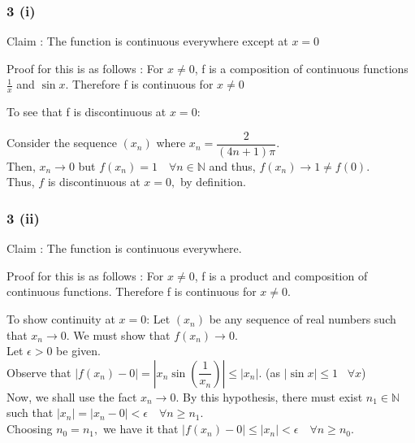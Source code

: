 \documentclass[handout]{beamer}
\begin{document}


\begin{frame}
\frametitle{3 (i)}
Claim : The function is continuous everywhere except at $x = 0$

Proof for this is as follows : 
For $x \ne  0$, f is a composition of continuous functions $\frac{1}{x}$ and $\sin{x}$. Therefore f is continuous 
for $x \ne  0$

To see that f is discontinuous at $x = 0 $:

Consider the sequence $(x_n)$ where $x_n = \dfrac{2}{(4n+1)\pi}.$\\
	Then, $x_n \to 0$ but $f(x_n) = 1 \quad \forall n \in \mathbb{N}$ and thus, $f(x_n) \to 1 \neq f(0).$\\
	Thus, $f$ is discontinuous at $x = 0,$ by definition.
\end{frame}

\begin{frame}
\frametitle{3 (ii)}
Claim : The function is continuous everywhere.

Proof for this is as follows : 
For $x \ne  0$, f is a product and composition of continuous functions. Therefore f is continuous for $x \ne 0$.

To show continuity at $x = 0$:
Let $(x_n)$ be any sequence of real numbers such that $x_n \to 0.$ We must show that $f(x_n) \to 0.$\\
Let $\epsilon > 0$ be given.\\
Observe that $|f(x_n) - 0| = \left|x_n\sin\left(\dfrac{1}{x_n}\right)\right| \le |x_n|.$ (as $|\sin{x}| \le 1 \; \; \; \forall x$)\\
Now, we shall use the fact $x_n \to 0.$ By this hypothesis, there must exist $n_1 \in \mathbb{N}$ such that $|x_n| = |x_n - 0| < \epsilon \quad \forall n \ge n_1.$\\
Choosing $n_0 = n_1,$ we have it that $|f(x_n) - 0| \le |x_n| < \epsilon \quad \forall n \ge n_0.$ 
\end{frame}
\end{document}
